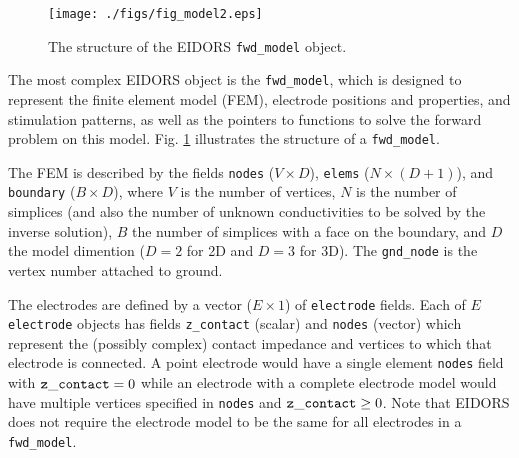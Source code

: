 \documentclass[12pt]{iopart}
\begin{document}
%
%
\begin{figure}[th]
\begin{flushright}
\texttt{[image: ./figs/fig\_model2.eps]}
\caption{\small The structure of the EIDORS {\tt fwd\_model} object.
\label{fig:fwd_model}
 }
\end{flushright}
\end{figure}


The most complex EIDORS object is the {\tt fwd\_model},
which is designed to represent the finite element model 
(FEM), electrode
positions and properties, and stimulation patterns, as
well as the pointers to functions to solve the forward
problem on this model. Fig. \ref{fig:fwd_model} illustrates
the structure of a {\tt fwd\_model}.

The FEM is described by the fields
{\tt nodes} ($V{\times}D$),
{\tt elems} ($N{\times}(D+1)$), and
{\tt boundary} ($B{\times}D$), where
$V$ is the number of vertices, $N$ is the number of
simplices (and also the number of unknown conductivities
to be solved by the inverse solution), $B$ the number
of simplices with a face on the boundary, and $D$ the
model dimention ($D=2$ for 2D and $D=3$ for 3D).
The {\tt gnd\_node} is the vertex number attached to ground.

The electrodes are defined by a vector ($E\times1$) of
{\tt electrode} fields. Each of $E$ {\tt electrode}
objects has fields
{\tt z\_contact} (scalar) and {\tt nodes} (vector)
 which represent the
(possibly complex) contact impedance
and vertices to which that electrode is connected.
A point electrode would have a single element
{\tt nodes} field with ${\tt z\_contact}=0$ while
an electrode with a complete electrode model
would have multiple vertices specified in {\tt nodes}
and ${\tt z\_contact}\ge0$. Note that EIDORS
does not require the electrode model to be the same
for all electrodes in a {\tt fwd\_model}.
\end{document}
